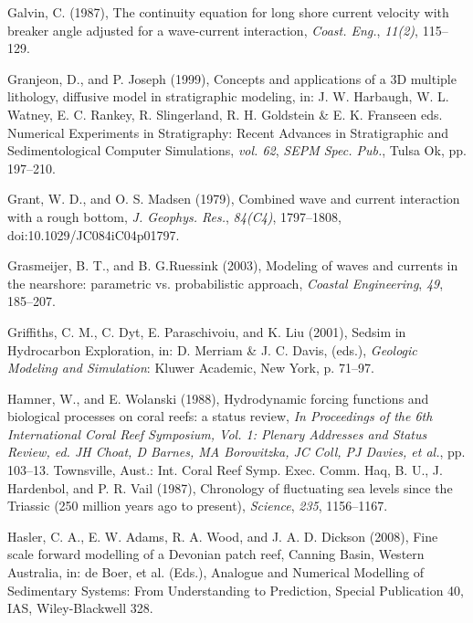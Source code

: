 \documentclass[default,jgrga]{agutex2015}
\begin{document}
\begin{article}
\begin{thebibliography}{}
Galvin, C. (1987), The continuity equation for long shore current velocity with breaker angle adjusted for a wave-current interaction, \textit{Coast. Eng.}, \textit{11(2)}, 115--129.

Granjeon, D., and P. Joseph (1999), Concepts and applications of a 3D multiple lithology, diffusive model in stratigraphic modeling, in: J. W. Harbaugh, W. L. Watney, E. C. Rankey, R. Slingerland, R. H. Goldstein \& E. K. Franseen eds. Numerical Experiments in Stratigraphy: Recent Advances in Stratigraphic and Sedimentological Computer Simulations, \textit{vol. 62}, \textit{SEPM Spec. Pub.}, Tulsa Ok, pp. 197--210.

Grant, W. D., and O. S. Madsen (1979), Combined wave and current interaction with a rough bottom, \textit{J. Geophys. Res.}, \textit{84(C4)}, 1797--1808, doi:10.1029/JC084iC04p01797.

Grasmeijer, B. T., and B. G.Ruessink (2003), Modeling of waves and currents in the nearshore: parametric vs. probabilistic approach, \textit{Coastal Engineering}, \textit{49}, 185--207.

Griffiths, C. M., C. Dyt, E. Paraschivoiu, and K. Liu (2001), Sedsim in Hydrocarbon Exploration, in: D. Merriam \& J. C. Davis, (eds.), \textit{Geologic Modeling and Simulation}: Kluwer Academic, New York, p. 71--97.

Hamner, W., and E. Wolanski (1988), Hydrodynamic forcing functions and biological processes on coral reefs: a status review, \textit{In Proceedings of the 6th International Coral Reef Symposium, Vol. 1: Plenary Addresses and Status Review, ed. JH Choat, D Barnes, MA Borowitzka, JC Coll, PJ Davies, et al.}, pp. 103--13. Townsville, Aust.: Int. Coral Reef Symp. Exec. Comm.
Haq, B. U., J. Hardenbol, and P. R. Vail (1987), Chronology of fluctuating sea levels since the Triassic (250 million years ago to present), \textit{Science}, \textit{235}, 1156--1167.

Hasler, C. A., E. W. Adams, R. A. Wood, and J. A. D. Dickson (2008), Fine scale forward modelling of a Devonian patch reef, Canning Basin, Western Australia, in: de Boer, et al. (Eds.), Analogue and Numerical Modelling of Sedimentary Systems: From Understanding to Prediction, Special Publication 40, IAS, Wiley-Blackwell 328.


\end{thebibliography}
\end{article}
\end{document}
